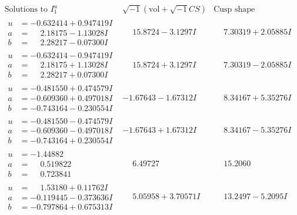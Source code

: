 \documentclass[1p]{elsarticle_modified}
\theoremstyle{definition}
\newcommand{\I}{\sqrt{-1}}
\begin{document}
$$\begin{array}{c|c|c}  
\text{Solutions to }I^u_{1}& \I (\text{vol} + \sqrt{-1}CS) & \text{Cusp shape}\\
 \hline 
\begin{aligned}
u &= -0.632414 + 0.947419 I \\
a &= \phantom{-}2.18175 - 1.13028 I \\
b &= \phantom{-}2.28217 - 0.07300 I\end{aligned}
 & \phantom{-}15.8724 - 3.1297 I & \phantom{-}7.30319 + 2.05885 I \\ \hline\begin{aligned}
u &= -0.632414 - 0.947419 I \\
a &= \phantom{-}2.18175 + 1.13028 I \\
b &= \phantom{-}2.28217 + 0.07300 I\end{aligned}
 & \phantom{-}15.8724 + 3.1297 I & \phantom{-}7.30319 - 2.05885 I \\ \hline\begin{aligned}
u &= -0.481550 + 0.474579 I \\
a &= -0.609360 + 0.497018 I \\
b &= -0.743164 - 0.230554 I\end{aligned}
 & -1.67643 - 1.67312 I & \phantom{-}8.34167 + 5.35276 I \\ \hline\begin{aligned}
u &= -0.481550 - 0.474579 I \\
a &= -0.609360 - 0.497018 I \\
b &= -0.743164 + 0.230554 I\end{aligned}
 & -1.67643 + 1.67312 I & \phantom{-}8.34167 - 5.35276 I \\ \hline\begin{aligned}
u &= -1.44882\phantom{ +0.000000I} \\
a &= \phantom{-}0.519822\phantom{ +0.000000I} \\
b &= \phantom{-}0.723841\phantom{ +0.000000I}\end{aligned}
 & \phantom{-}6.49727\phantom{ +0.000000I} & \phantom{-}15.2060\phantom{ +0.000000I} \\ \hline\begin{aligned}
u &= \phantom{-}1.53180 + 0.11762 I \\
a &= -0.119445 - 0.373636 I \\
b &= -0.797864 + 0.675313 I\end{aligned}
 & \phantom{-}5.05958 + 3.70571 I & \phantom{-}13.2497 - 5.2095 I \\ \hline\begin{aligned}

\end{aligned}
\end{array}$$
\end{document}
